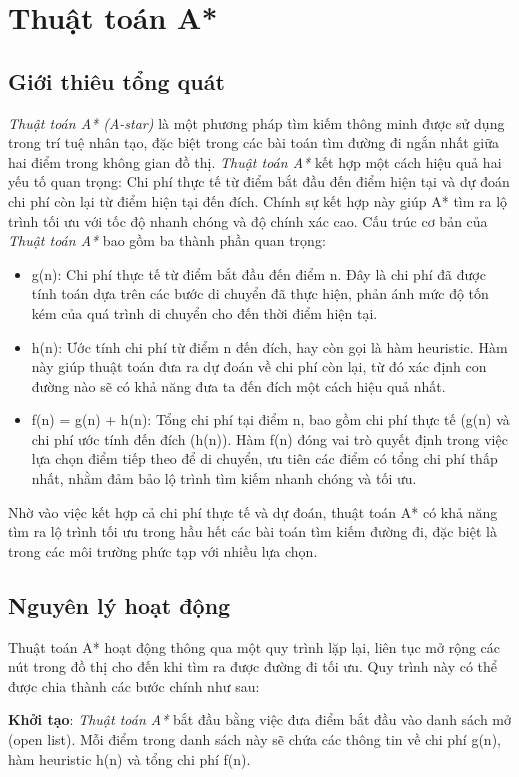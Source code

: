 \documentclass{article}
\begin{document}
\section{Thuật toán A*}
\subsection{Giới thiêu tổng quát}
\textit{Thuật toán A* (A-star) }là một phương pháp tìm kiếm thông minh được sử dụng trong trí tuệ nhân tạo, đặc biệt trong các bài toán tìm đường đi ngắn nhất giữa hai điểm trong không gian đồ thị. \textit{Thuật toán A*} kết hợp một cách hiệu quả hai yếu tố quan trọng: Chi phí thực tế từ điểm bắt đầu đến điểm hiện tại và dự đoán chi phí còn lại từ điểm hiện tại đến đích. Chính sự kết hợp này giúp A* tìm ra lộ trình tối ưu với tốc độ nhanh chóng và độ chính xác cao.
Cấu trúc cơ bản của \textit{Thuật toán A*} bao gồm ba thành phần quan trọng:
\begin{itemize}
    \item g(n): Chi phí thực tế từ điểm bắt đầu đến điểm n. Đây là chi phí đã được tính toán dựa trên các bước di chuyển đã thực hiện, phản ánh mức độ tốn kém của quá trình di chuyển cho đến thời điểm hiện tại.
    \item h(n): Ước tính chi phí từ điểm n đến đích, hay còn gọi là hàm heuristic. Hàm này giúp thuật toán đưa ra dự đoán về chi phí còn lại, từ đó xác định con đường nào sẽ có khả năng đưa ta đến đích một cách hiệu quả nhất.
    \item f(n) = g(n) + h(n): Tổng chi phí tại điểm n, bao gồm chi phí thực tế (g(n) và chi phí ước tính đến đích (h(n)). Hàm f(n) đóng vai trò quyết định trong việc lựa chọn điểm tiếp theo để di chuyển, ưu tiên các điểm có tổng chi phí thấp nhất, nhằm đảm bảo lộ trình tìm kiếm nhanh chóng và tối ưu.
\end{itemize}
Nhờ vào việc kết hợp cả chi phí thực tế và dự đoán, thuật toán A* có khả năng tìm ra lộ trình tối ưu trong hầu hết các bài toán tìm kiếm đường đi, đặc biệt là trong các môi trường phức tạp với nhiều lựa chọn.
\subsection{Nguyên lý hoạt động}
Thuật toán A* hoạt động thông qua một quy trình lặp lại, liên tục mở rộng các nút trong đồ thị cho đến khi tìm ra được đường đi tối ưu. Quy trình này có thể được chia thành các bước chính như sau:

\textbf{Khởi tạo}: 
\textit{Thuật toán A*} bắt đầu bằng việc đưa điểm bắt đầu vào danh sách mở (open list). Mỗi điểm trong danh sách này sẽ chứa các thông tin về chi phí g(n), hàm heuristic h(n) và tổng chi phí f(n).
\end{document}
